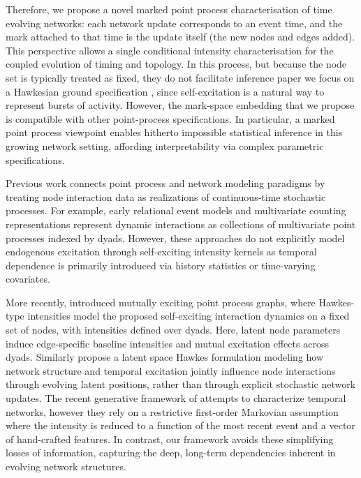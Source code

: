 \documentclass[12pt]{article}
\begin{document}
Therefore, we propose a novel marked point process  \citep{daley2003introduction,kallenberg1976random} characterisation of time evolving networks: each network update corresponds to an event time, and the mark attached to that time is the update itself (the new nodes and edges added). This perspective allows a single conditional intensity characterisation for the coupled evolution of timing and topology. In this process, but because the node set is typically treated as fixed, they do not facilitate inference paper we focus on a Hawkesian ground specification \citep{Hawkes1971,hawkes1974cluster}, since self-excitation is a natural way to represent bursts of activity. However, the mark-space embedding that we propose is compatible with other point-process specifications. In particular, a marked point process viewpoint enables hitherto impossible statistical inference in this growing network setting, affording interpretability via complex parametric specifications.

Previous work connects point process and network modeling paradigms by treating node interaction data as realizations of continuous-time stochastic processes. For example, early relational event models \citep{Butts2008, VuHunterSmythAsuncion2011, HunterSmythVuAsuncion2011} and multivariate counting representations \citep{PerryWolfe2013} represent dynamic interactions  as collections of multivariate point processes indexed by dyads. However, these approaches do not explicitly model endogenous excitation through self-exciting intensity kernels as temporal dependence is primarily introduced via history statistics or time-varying covariates.


More recently, \citet{PassinoHeard2023} introduced mutually exciting point process graphs, where Hawkes-type intensities model the proposed self-exciting interaction dynamics on a fixed set of nodes, with intensities defined over dyads. Here, latent node parameters induce edge-specific baseline intensities and mutual excitation effects across dyads. Similarly \citep{HuangLatentHawkes2022} propose a latent space Hawkes formulation modeling how network structure and temporal excitation jointly influence node interactions through evolving latent positions, rather than through explicit stochastic network updates. The recent generative framework of \citep{Perez2025} attempts to characterize temporal networks, however they rely on a restrictive first-order Markovian assumption where the intensity is reduced to a function of the most recent event and a vector of hand-crafted features. In contrast, our framework avoids these simplifying losses of information, capturing the deep, long-term dependencies inherent in evolving network structures.
\end{document}
